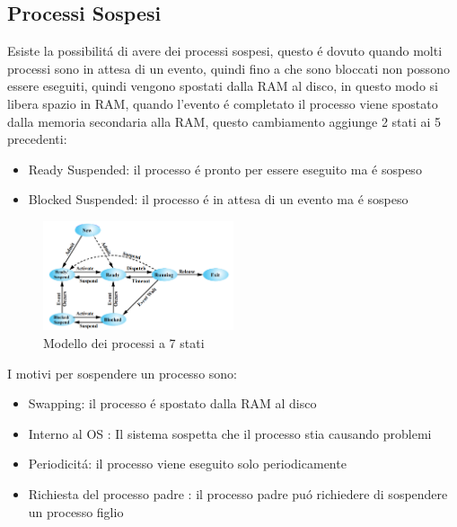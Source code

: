 \documentclass[11pt]{article}
\begin{document}
\subsection{Processi Sospesi}
Esiste la possibilitá di avere dei processi sospesi, questo é dovuto quando molti processi sono in attesa di un evento,
quindi fino a che sono bloccati non possono essere eseguiti, quindi vengono spostati dalla RAM al disco, in questo modo
si libera spazio in RAM, quando l'evento é completato il processo viene spostato dalla memoria secondaria alla RAM,
questo cambiamento aggiunge 2 stati ai 5 precedenti:
\begin{itemize}
    \item Ready Suspended: il processo é pronto per essere eseguito ma é sospeso
    \item Blocked Suspended: il processo é in attesa di un evento ma é sospeso
\end{itemize}
\begin{figure}
    \centering
    \includegraphics[width=0.5\textwidth]{immagini/7State}
    \caption{Modello dei processi a 7 stati}
\end{figure}
I motivi per sospendere un processo sono:
\begin{itemize}
    \item Swapping: il processo é spostato dalla RAM al disco
    \item Interno al OS : Il sistema sospetta che il processo stia causando problemi
    \item Periodicitá: il processo viene eseguito solo periodicamente
    \item Richiesta del processo padre : il processo padre puó richiedere di sospendere un processo figlio
\end{itemize}
\end{document}

